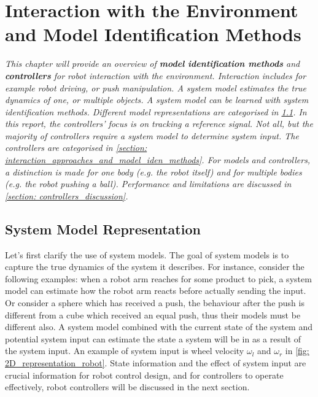 \chapter{Interaction with the Environment and Model Identification Methods}
\label{chapter: interaction_with_env_and_model_identification}
\textit{This chapter will provide an overview of \textbf{model identification methods} and \textbf{controllers} for robot interaction with the environment. Interaction includes for example robot driving, or push manipulation. A system model estimates the true dynamics of one, or multiple objects. A system model can be learned with system identification methods. Different model representations are categorised in \cref{section: system_model_representation}. In this report, the controllers' focus is on tracking a reference signal. Not all, but the majority of controllers require a system model to determine system input. The controllers are categorised in \cref{section: interaction_approaches_and_model_iden_methods}. For models and controllers, a distinction is made for one body (e.g. the robot itself) and for multiple bodies (e.g. the robot pushing a ball). Performance and limitations are discussed in \cref{section: controllers_discussion}.
}

\section{System Model Representation}
\label{section: system_model_representation}
Let's first clarify the use of system models. The goal of system models is to capture the true dynamics of the system it describes. For instance, consider the following examples: when a robot arm reaches for some product to pick, a system model can estimate how the robot arm reacts before actually sending the input. Or consider a sphere which has received a push, the behaviour after the push is different from a cube which received an equal push, thus their models must be different also. A system model combined with the current state of the system and potential system input can estimate the state a system will be in as a result of the system input. An example of system input is wheel velocity $\omega_l$ and $\omega_r$ in \cref{fig: 2D_representation_robot}. State information and the effect of system input are crucial information for robot control design, and for controllers to operate effectively, robot controllers will be discussed in the next section.\\

